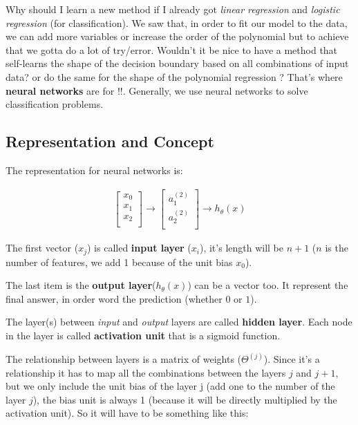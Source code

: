 Why should I learn a new method if I already got \textit{linear regression} and \textit{logistic regression} (for classification). We saw that, in order to fit our model to the data, we can add more variables or increase the order of the polynomial but to achieve that we gotta do a lot of try/error. Wouldn't it be nice to have a method that self-learns the shape of the decision boundary based on all combinations of input data? or do the same for the shape of the polynomial regression ? That's where \textbf{neural networks} are for !!. Generally, we use neural networks to solve classification problems.

\subsection{Representation and Concept}

The representation for neural networks is:

\begin{align}
	\begin{bmatrix}
		x_0 \\
		x_1 \\
		x_2 \\
	\end{bmatrix}
	\rightarrow
	\begin{bmatrix}
		a_1^{(2)} \\
		a_2^{(2)} \\
	\end{bmatrix}
	\rightarrow
	h_{\theta}(x)
\end{align}

The first vector ($x_j$) is called \textbf{input layer} ($x_i$), it's length will be $n + 1$ ($n$ is the number of features, we add 1 because of the unit bias $x_0$). 

The last item is the \textbf{output layer}($h_{\theta}(x)$) can be a vector too. It represent the final answer, in order word the prediction (whether $0$ or $1$).

The layer(s) between \textit{input} and \textit{output} layers are called \textbf{hidden layer}. Each node in the layer is called \textbf{activation unit} that is a sigmoid function.

The relationship between layers is a matrix of weights ($\Theta^{(j)}$). Since it's a relationship it has to map all the combinations between the layers $j$ and $j + 1$, but we only include the unit bias of the layer j (add one to the number of the layer $j$), the bias unit is always 1 (because it will be directly multiplied by the activation unit). So it will have to be something like this: 


